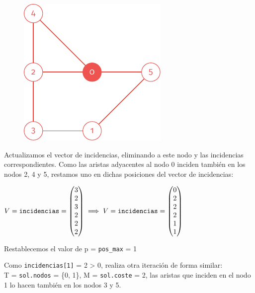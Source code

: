 \documentclass[11pt]{article}
\begin{document}
\begin{figure}[H]
	\centering \includegraphics{./img/grafo-ejemplo-1.pdf}
\end{figure}

Actualizamos el vector de incidencias, eliminando a este nodo y las incidencias correspondientes. Como las aristas adyacentes al nodo 0 inciden también en los nodos 2, 4 y 5, restamos uno en dichas posiciones del vector de incidencias: \\

\vspace{1em}

$\displaystyle V = \verb|incidencias| =
\begin{pmatrix}
	3 \\
	2 \\
	3 \\
	2 \\
	2 \\
	2
\end{pmatrix} \implies V = \verb|incidencias| =
\begin{pmatrix}
	0 \\
	2 \\
	2 \\
	2 \\
	1 \\
	1
\end{pmatrix}$

\vspace{1em}

Restablecemos el valor de p = \verb|pos_max| = 1

Como \verb|incidencias[1]| = 2 > 0, realiza otra iteración de forma similar:\\

 T = \verb|sol.nodos| = \{0, 1\}, M = \verb|sol.coste| = 2, las aristas que inciden en el nodo 1 lo hacen también en los nodos 3 y 5.\\
\end{document}
